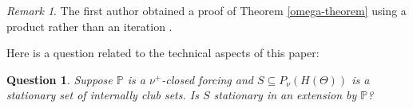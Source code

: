 \documentclass[a4paper]{amsart}
\theoremstyle{definition}
\theoremstyle{remark}
\newtheorem{mybem}[mydef]{Remark}
\theoremstyle{plain}
\newtheorem{myquest}[mydef]{Question}
\numberwithin{mydef}{section}
\DeclareMathOperator{\ICNIA}{\textup{\textsf{ICNIA}}}
\newcommand{\dP}{\mathbb{P}}
\begin{document}

\begin{mybem} The first author obtained a proof of Theorem \autoref{omega-theorem} using a product rather than an iteration \cite{Jakob-thesis}.\end{mybem}

Here is a question related to the technical aspects of this paper:

\begin{myquest} Suppose $\dP$ is a $\nu^+$-closed forcing and $S \subseteq P_\nu(H(\Theta))$ is a stationary set of internally club sets. Is $S$ stationary in an extension by $\dP$?\end{myquest}





\end{document}
